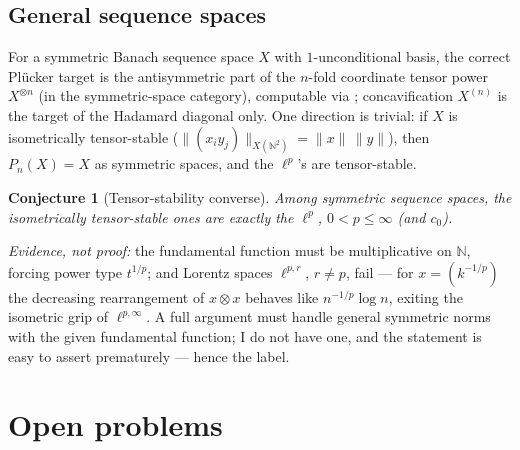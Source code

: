 \documentclass[11pt]{amsart}
\newtheorem{conjecture}[theorem]{Conjecture}
\theoremstyle{definition}
\newcommand{\N}{\mathbb{N}}
\begin{document}
\subsection{General sequence spaces} For a symmetric Banach sequence space $X$ with $1$-unconditional basis, the correct Pl\"ucker target is the antisymmetric part of the $n$-fold coordinate tensor power $X^{\otimes n}$ (in the symmetric-space category), computable via \cite{Cal,Loz}; concavification $X^{(n)}$ is the target of the Hadamard diagonal only. One direction is trivial: if $X$ is isometrically tensor-stable ($\|(x_iy_j)\|_{X(\N^2)}=\|x\|\,\|y\|$), then $P_n(X)=X$ as symmetric spaces, and the $\ell^p$'s are tensor-stable.

\begin{conjecture}[Tensor-stability converse]\label{conj:stable}
Among symmetric sequence spaces, the isometrically tensor-stable ones are exactly the $\ell^p$, $0<p\le\infty$ \textup{(}and $c_0$\textup{)}.
\end{conjecture}

\noindent\emph{Evidence, not proof:} the fundamental function must be multiplicative on $\N$, forcing power type $t^{1/p}$; and Lorentz spaces $\ell^{p,r}$, $r\ne p$, fail --- for $x=(k^{-1/p})$ the decreasing rearrangement of $x\otimes x$ behaves like $n^{-1/p}\log n$, exiting the isometric grip of $\ell^{p,\infty}$. A full argument must handle general symmetric norms with the given fundamental function; I do not have one, and the statement is easy to assert prematurely --- hence the label.

\section{Open problems}\label{sec:open}
\end{document}
